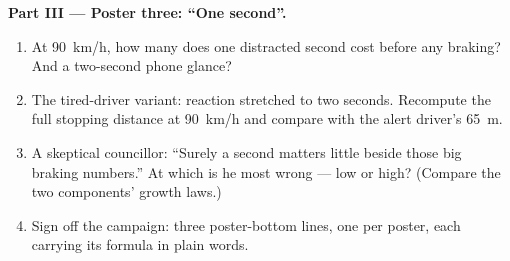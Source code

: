 \begin{problem}
\medskip\noindent\textbf{Part III --- Poster three: ``One
second''.}
\begin{enumerate}[resume]
  \item At \qty{90}{km/h}, how many  does one
        distracted second cost before any braking? And a
        two-second phone glance?
  \item The tired-driver variant: reaction stretched to two
        seconds. Recompute the full stopping distance at
        \qty{90}{km/h} and compare with the alert
        driver's \qty{65}{m}.
  \item A skeptical councillor: ``Surely a second matters
        little beside those big braking numbers.'' At which
         is he most wrong --- low or high? (Compare
        the two components' growth laws.)
  \item Sign off the campaign: three poster-bottom lines,
        one per poster, each carrying its formula in
        plain words.
\end{enumerate}
\end{problem}
